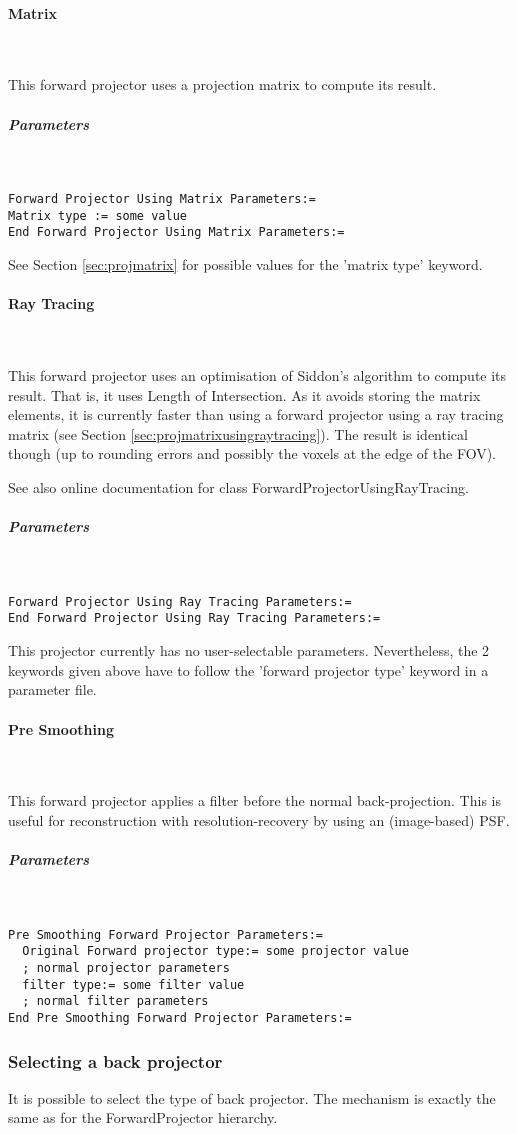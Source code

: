 \documentclass{article}
\newcommand{\subsubsubsection}[1]{\paragraph{#1}\mbox{} \\}
\newcommand{\subsubsubsubsection}[1]{\subparagraph{#1} \mbox{} \\}
\begin{document}
{{ \subsubsubsection{Matrix}
}
This forward projector uses a projection matrix to compute its 
result.

{ \subsubsubsubsection{Parameters}
}
\begin{verbatim}
Forward Projector Using Matrix Parameters:=
Matrix type := some value
End Forward Projector Using Matrix Parameters:=
\end{verbatim}

See Section \ref{sec:projmatrix} for possible values for the 'matrix type' keyword.

{ \subsubsubsection{Ray Tracing}
}
This forward projector uses an optimisation of Siddon's algorithm 
to compute its result. That is, it uses Length of Intersection. 
As it avoids storing the matrix elements, it is currently faster 
than using a forward projector using a ray tracing matrix (see 
Section \ref{sec:projmatrixusingraytracing}). The result is identical though (up to rounding 
errors and possibly the voxels at the edge of the FOV).


See also online documentation for class ForwardProjectorUsingRayTracing.

{ \subsubsubsubsection{Parameters}
}
\begin{verbatim}
Forward Projector Using Ray Tracing Parameters:=
End Forward Projector Using Ray Tracing Parameters:=
\end{verbatim}

This projector currently has no user-selectable parameters. Nevertheless, 
the 2 keywords given above have to follow the 'forward projector 
type' keyword in a parameter file.

{ \subsubsubsection{Pre Smoothing}
}
This forward projector applies a filter before the normal back-projection.
This is useful for reconstruction with resolution-recovery 
by using an (image-based) PSF.

{ \subsubsubsubsection{Parameters}
}
\begin{verbatim}
Pre Smoothing Forward Projector Parameters:=
  Original Forward projector type:= some projector value 
  ; normal projector parameters
  filter type:= some filter value
  ; normal filter parameters
End Pre Smoothing Forward Projector Parameters:=
\end{verbatim}

\subsubsection{
Selecting a back projector}
\label{sec:backprojectors}
It is possible to select the type of back projector. The mechanism 
is exactly the same as for the ForwardProjector hierarchy.

}
\end{document}
